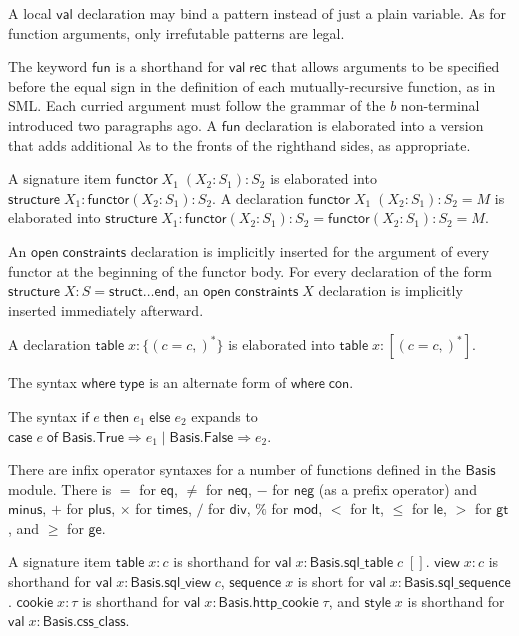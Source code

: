 \documentclass{article}
\newcommand{\mt}[1]{\mathsf{#1}}
\begin{document}
A local $\mt{val}$ declaration may bind a pattern instead of just a plain variable.  As for function arguments, only irrefutable patterns are legal.

The keyword $\mt{fun}$ is a shorthand for $\mt{val} \; \mt{rec}$ that allows arguments to be specified before the equal sign in the definition of each mutually-recursive function, as in SML.  Each curried argument must follow the grammar of the $b$ non-terminal introduced two paragraphs ago.  A $\mt{fun}$ declaration is elaborated into a version that adds additional $\lambda$s to the fronts of the righthand sides, as appropriate.

A signature item $\mt{functor} \; X_1 \; (X_2 : S_1) : S_2$ is elaborated into $\mt{structure} \; X_1 : \mt{functor}(X_2 : S_1) : S_2$.  A declaration $\mt{functor} \; X_1 \; (X_2 : S_1) : S_2 = M$ is elaborated into $\mt{structure} \; X_1 : \mt{functor}(X_2 : S_1) : S_2 = \mt{functor}(X_2 : S_1) : S_2 = M$.

An $\mt{open} \; \mt{constraints}$ declaration is implicitly inserted for the argument of every functor at the beginning of the functor body.  For every declaration of the form $\mt{structure} \; X : S = \mt{struct} \ldots \mt{end}$, an $\mt{open} \; \mt{constraints} \; X$ declaration is implicitly inserted immediately afterward.

A declaration $\mt{table} \; x : \{(c = c,)^*\}$ is elaborated into $\mt{table} \; x : [(c = c,)^*]$.

The syntax $\mt{where} \; \mt{type}$ is an alternate form of $\mt{where} \; \mt{con}$.

The syntax $\mt{if} \; e \; \mt{then} \; e_1 \; \mt{else} \; e_2$ expands to $\mt{case} \; e \; \mt{of} \; \mt{Basis}.\mt{True} \Rightarrow e_1 \mid \mt{Basis}.\mt{False} \Rightarrow e_2$.

There are infix operator syntaxes for a number of functions defined in the $\mt{Basis}$ module.  There is $=$ for $\mt{eq}$, $\neq$ for $\mt{neq}$, $-$ for $\mt{neg}$ (as a prefix operator) and $\mt{minus}$, $+$ for $\mt{plus}$, $\times$ for $\mt{times}$, $/$ for $\mt{div}$, $\%$ for $\mt{mod}$, $<$ for $\mt{lt}$, $\leq$ for $\mt{le}$, $>$ for $\mt{gt}$, and $\geq$ for $\mt{ge}$.

A signature item $\mt{table} \; x : c$ is shorthand for $\mt{val} \; x : \mt{Basis}.\mt{sql\_table} \; c \; []$.  $\mt{view} \; x : c$ is shorthand for $\mt{val} \; x : \mt{Basis}.\mt{sql\_view} \; c$, $\mt{sequence} \; x$ is short for $\mt{val} \; x : \mt{Basis}.\mt{sql\_sequence}$.  $\mt{cookie} \; x : \tau$ is shorthand for $\mt{val} \; x : \mt{Basis}.\mt{http\_cookie} \; \tau$, and $\mt{style} \; x$ is shorthand for $\mt{val} \; x : \mt{Basis}.\mt{css\_class}$.
\end{document}
